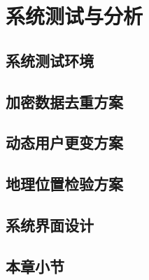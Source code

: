 \chapter{系统测试与分析}

\section{系统测试环境}

\section{加密数据去重方案}

\section{动态用户更变方案}

\section{地理位置检验方案}

\section{系统界面设计}

\section{本章小节}

\endinput